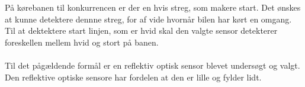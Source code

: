
På kørebanen til konkurrencen er der en hvis streg, som makere start. Det ønskes at kunne detektere dennne streg, for af vide hvornår bilen har kørt en omgang.\\
Til at dektektere start linjen, som er hvid skal den valgte sensor detekterer foreskellen mellem hvid og stort på banen.\\
 \\
Til det pågældende formål er en reflektiv optisk sensor blevet undersøgt og valgt. Den reflektive optiske sensore har fordelen at den er lille og fylder lidt.

